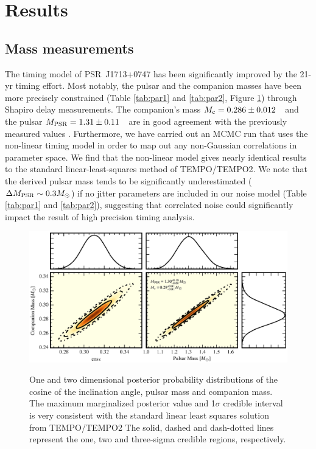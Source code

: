 \section{Results}
\label{sec:res}

\subsection{Mass measurements}
\label{sec:mass}
The timing model of PSR~J1713+0747 has been significantly improved by the 21-yr timing effort.
Most notably, the pulsar and the companion masses have been more precisely
constrained (Table \ref{tab:par1} and \ref{tab:par2}, Figure \ref{fig:masses}) through Shapiro delay measurements. The
companion's mass $M_{\rm c} = 0.286\pm0.012$~\Msun\, and the pulsar $M_{\rm
PSR}=1.31\pm0.11$~\Msun\, are in good agreement with the previously measured
values \citep{sns+05}. Furthermore, we have carried out an MCMC run that uses the non-linear timing
model in order to map out any non-Gaussian correlations in parameter space. We find that the non-linear
model gives nearly identical results to the standard linear-least-squares
method of \textsc{TEMPO}/\textsc{TEMPO2}.
We note that the derived pulsar mass tends to be significantly underestimated
($\Delta M_{\rm PSR} \sim 0.3 M_{\odot}$) if no jitter parameters are included in our noise model (Table
\ref{tab:par1} and \ref{tab:par2}), suggesting that
correlated noise could significantly impact the result of high
precision timing analysis.

\begin{figure}[!ht]
\centering
\includegraphics[scale=1]{1713_masses_color.eps} \\ 
\caption {\label{fig:masses}  One and two dimensional posterior probability
distributions of the cosine of the inclination
angle, pulsar mass and companion mass. The maximum marginalized posterior
value and 1$\sigma$ credible interval is very consistent with the standard linear least
squares solution from \textsc{TEMPO}/\textsc{TEMPO2} The solid, dashed and dash-dotted lines represent the one, two and three-sigma credible regions, respectively.
} 
\end{figure} 


